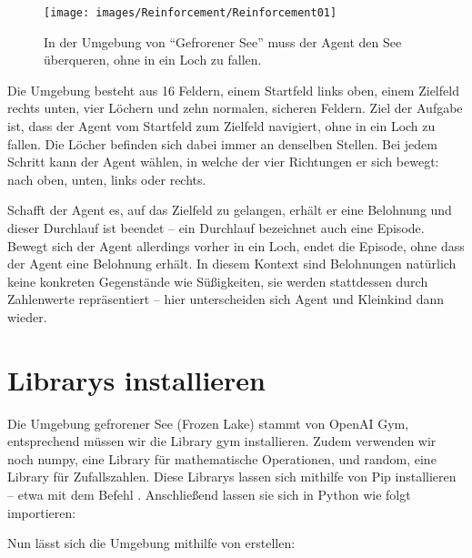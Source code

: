 \begin{figure}
    \texttt{[image: images/Reinforcement/Reinforcement01]}
    \caption{In der Umgebung von ``Gefrorener See'' muss der Agent den See überqueren, ohne in ein Loch zu fallen.} \label{Reinforcement01}
\end{figure}




Die Umgebung besteht aus 16 Feldern, einem Startfeld links oben, einem Zielfeld rechts unten, vier Löchern und zehn normalen, sicheren Feldern. Ziel der Aufgabe ist, dass der Agent vom Startfeld zum Zielfeld navigiert, ohne in ein Loch zu fallen. Die Löcher befinden sich dabei immer an denselben Stellen. Bei jedem Schritt kann der Agent wählen, in welche der vier Richtungen er sich bewegt: nach oben, unten, links oder rechts.

Schafft der Agent es, auf das Zielfeld zu gelangen, erhält er eine Belohnung und dieser Durchlauf ist beendet -- ein Durchlauf bezeichnet auch eine Episode. Bewegt sich der Agent allerdings vorher in ein Loch, endet die Episode, ohne dass der Agent eine Belohnung erhält. In diesem Kontext sind Belohnungen natürlich keine konkreten Gegenstände wie Süßigkeiten, sie werden stattdessen durch Zahlenwerte repräsentiert -- hier unterscheiden sich Agent und Kleinkind dann wieder.

\section{Librarys installieren}

Die Umgebung gefrorener See (Frozen Lake) stammt von OpenAI Gym, entsprechend müssen wir die Library gym installieren. Zudem verwenden wir noch numpy, eine Library für mathematische Operationen, und random, eine Library für Zufallszahlen. Diese Librarys lassen sich mithilfe von Pip installieren -- etwa mit dem Befehl . Anschließend lassen sie sich in Python wie folgt importieren:

\medskip




\medskip


Nun lässt sich die Umgebung mithilfe von  erstellen:

\medskip


